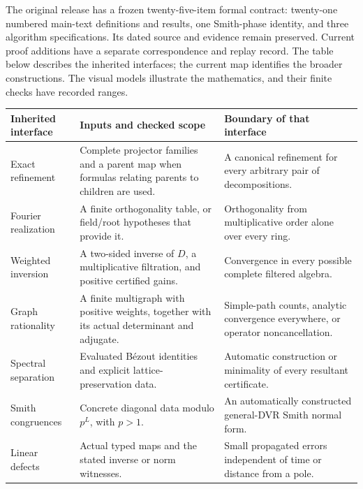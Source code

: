 
The original release has a frozen twenty-five-item formal contract: twenty-one numbered main-text definitions and results, one Smith-phase identity, and three algorithm specifications. Its dated source and evidence remain preserved. Current proof additions have a separate correspondence and replay record. The table below describes the inherited interfaces; the current map identifies the broader constructions. The visual models illustrate the mathematics, and their finite checks have recorded ranges.



{\small
\begin{tabularx}{\linewidth}{@{}p{.28\linewidth}YY@{}}\toprule
\textbf{Inherited interface} & \textbf{Inputs and checked scope} & \textbf{Boundary of that interface}\\\midrule
Exact refinement & Complete projector families and a parent map when formulas relating parents to children are used. & A canonical refinement for every arbitrary pair of decompositions.\\
Fourier realization & A finite orthogonality table, or field/root hypotheses that provide it. & Orthogonality from multiplicative order alone over every ring.\\
Weighted inversion & A two-sided inverse of $D$, a multiplicative filtration, and positive certified gains. & Convergence in every possible complete filtered algebra.\\
Graph rationality & A finite multigraph with positive weights, together with its actual determinant and adjugate. & Simple-path counts, analytic convergence everywhere, or operator noncancellation.\\
Spectral separation & Evaluated B\'ezout identities and explicit lattice-preservation data. & Automatic construction or minimality of every resultant certificate.\\
Smith congruences & Concrete diagonal data modulo $p^L$, with $p>1$. & An automatically constructed general-DVR Smith normal form.\\
Linear defects & Actual typed maps and the stated inverse or norm witnesses. & Small propagated errors independent of time or distance from a pole.\\\bottomrule
\end{tabularx}}

